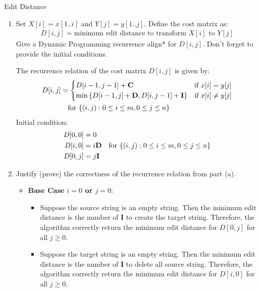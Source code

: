 \documentclass{article}
\numberwithin{table}{section}
\numberwithin{figure}{section}
\begin{document}
\begin{section}{Edit Distance}
\begin{enumerate}
    \item Set $X[i] = x[1..i]$ and $Y[j] = y[1..j]$. Define the cost matrix as:
    \begin{align*}
        D[i, j] = \text{minimum edit distance to transform $X[i]$ to $Y[j]$}
    \end{align*}
    Give a Dynamic Programming recurrence align* for $D[i, j]$. Don’t forget to provide the initial conditions.
    \begin{tcolorbox}
        The recurrence relation of the cost matrix $D[i, j]$ is given by:
        \begin{align*}
            D[i, j] &= 
            \begin{cases}
                D[i-1, j-1] + \mathbf{C} & \text{if $x[i] = y[j]$}\\
                \min \left\{D[i-1, j] + \mathbf{D}, D[i, j-1] + \mathbf{I}\right\} & \text{if $x[i] \neq y[j]$}
            \end{cases} \\
            & \quad \text{for $\left\{(i,j) : 0 \leq i \leq m, 0 \leq j \leq n\right\}$}
        \end{align*}
        Initial condition: 
        \begin{align*}
            \begin{split}
                D[0, 0] &= 0 \\
                D[i, 0] &= i\mathbf{D} \\ 
                D[0, j] &= j\mathbf{I} \\
            \end{split}
            \quad \text{for $\left\{(i,j) : 0 \leq i \leq m, 0 \leq j \leq n\right\}$}
        \end{align*}
    \end{tcolorbox}
    
    \item Justify (prove) the correctness of the recurrence relation from part (a).
    \begin{tcolorbox}[breakable]
    \begin{itemize}
        \item \textbf{Base Case $i = 0$ or $j = 0$}: 
        \begin{itemize}
            \item Suppose the source string is an empty string. Then the minimum edit distance is the number of $\mathbf{I}$ to create the target string. Therefore, the algorithm correctly return the minimum edit distance for $D[0, j]$ for all $j \geq 0$.
            \item Suppose the target string is an empty string. Then the minimum edit distance is the number of $\mathbf{I}$ to delete all source string. Therefore, the algorithm correctly return the minimum edit distance for $D[i, 0]$ for all $j \geq 0$.
        \end{itemize}
        

\end{itemize}
\end{tcolorbox}
\end{enumerate}
\end{section}
\end{document}
